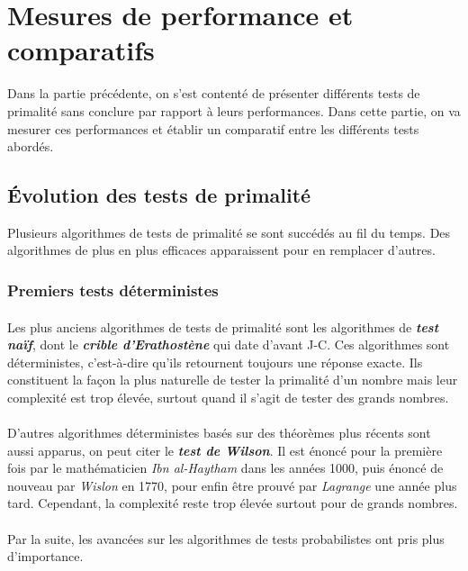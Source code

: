 \section{Mesures de performance et comparatifs}
	Dans la partie précédente, on s'est contenté de présenter différents tests de primalité sans conclure par rapport à leurs performances. Dans cette partie, on va mesurer ces performances et établir un comparatif entre les différents tests abordés.
	
	\subsection{Évolution des tests de primalité}
		Plusieurs algorithmes de tests de primalité se sont succédés au fil du temps. Des algorithmes de plus en plus efficaces apparaissent pour en remplacer d'autres.
	
		\subsubsection*{Premiers tests déterministes}
			\paragraph{}Les plus anciens algorithmes de tests de primalité sont les algorithmes de \textit{\textbf{test naïf}}, dont le \textit{\textbf{crible d'Erathostène}} qui date d'avant J-C. Ces algorithmes sont déterministes, c'est-à-dire qu'ils retournent toujours une réponse exacte. Ils constituent la façon la plus naturelle de tester la primalité d'un nombre mais leur complexité est trop élevée, surtout quand il s'agit de tester des grands nombres.
			
			\paragraph{}D'autres algorithmes déterministes basés sur des théorèmes plus récents sont aussi apparus, on peut citer le \textit{\textbf{test de Wilson}}. Il est énoncé pour la première fois par le mathématicien \textit{Ibn al-Haytham} dans les années 1000, puis énoncé de nouveau par \textit{Wislon} en 1770, pour enfin être prouvé par \textit{Lagrange} une année plus tard. Cependant, la complexité reste trop élevée surtout pour de grands nombres.
			
			\paragraph{} Par la suite, les avancées sur les algorithmes de tests probabilistes ont pris plus d'importance.
		
